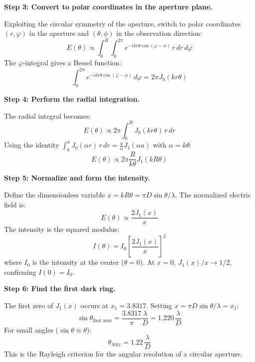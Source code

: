 \documentclass[11pt,openright]{book}
\begin{document}
\textbf{Step 3: Convert to polar coordinates in the aperture plane.}

Exploiting the circular symmetry of the aperture, switch to polar coordinates $(r,\varphi)$ in the aperture and $(\theta,\phi)$ in the observation direction:
\begin{equation}
E(\theta) \propto \int_0^R \int_0^{2\pi} e^{-ikr\theta\cos(\varphi-\phi)}\,r\,dr\,d\varphi
\end{equation}
The $\varphi$-integral gives a Bessel function:
\begin{equation}
\int_0^{2\pi} e^{-ikr\theta\cos(\varphi-\phi)}\,d\varphi = 2\pi J_0(kr\theta)
\end{equation}

\textbf{Step 4: Perform the radial integration.}

The radial integral becomes:
\begin{equation}
E(\theta) \propto 2\pi\int_0^R J_0(kr\theta)\,r\,dr
\end{equation}
Using the identity $\int_0^a J_0(\alpha r)\,r\,dr = \frac{a}{\alpha}J_1(\alpha a)$ with $\alpha = k\theta$:
\begin{equation}
E(\theta) \propto 2\pi\frac{R}{k\theta}J_1(kR\theta)
\end{equation}

\textbf{Step 5: Normalize and form the intensity.}

Define the dimensionless variable $x = kR\theta = \pi D\sin\theta/\lambda$. The normalized electric field is:
\begin{equation}
E(\theta) \propto \frac{2J_1(x)}{x}
\end{equation}
The intensity is the squared modulus:
\begin{equation}
I(\theta) = I_0\left[\frac{2J_1(x)}{x}\right]^2
\end{equation}
where $I_0$ is the intensity at the center ($\theta = 0$). At $x = 0$, $J_1(x)/x \to 1/2$, confirming $I(0) = I_0$.

\textbf{Step 6: Find the first dark ring.}

The first zero of $J_1(x)$ occurs at $x_1 = 3.8317$. Setting $x = \pi D\sin\theta/\lambda = x_1$:
\begin{equation}
\sin\theta_{\text{first zero}} = \frac{3.8317}{\pi}\frac{\lambda}{D} = 1.220\,\frac{\lambda}{D}
\end{equation}
For small angles ($\sin\theta \approx \theta$):
\begin{equation}
\theta_{\text{Airy}} = 1.22\,\frac{\lambda}{D}
\end{equation}
This is the Rayleigh criterion for the angular resolution of a circular aperture.
\end{document}
